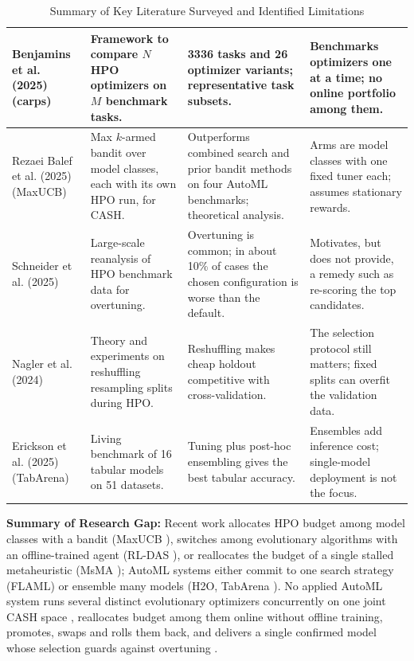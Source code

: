 \documentclass[11pt, a4paper]{article}
\begin{document}
\begin{table}[H]
\begin{tabular}{|p{3.2cm}|p{4.2cm}|p{4.0cm}|p{3.8cm}|}
        \hline
        Benjamins et al. (2025) \cite{benjamins2025carps} (carps) & Framework to compare $N$ HPO optimizers on $M$ benchmark tasks. & 3336 tasks and 26 optimizer variants; representative task subsets. & Benchmarks optimizers one at a time; no online portfolio among them. \\
        \hline
        Rezaei Balef et al. (2025) \cite{balef2025cash} (MaxUCB) & Max $k$-armed bandit over model classes, each with its own HPO run, for CASH. & Outperforms combined search and prior bandit methods on four AutoML benchmarks; theoretical analysis. & Arms are model classes with one fixed tuner each; assumes stationary rewards. \\
        \hline
        Schneider et al. (2025) \cite{schneider2025overtuning} & Large-scale reanalysis of HPO benchmark data for overtuning. & Overtuning is common; in about 10\% of cases the chosen configuration is worse than the default. & Motivates, but does not provide, a remedy such as re-scoring the top candidates. \\
        \hline
        Nagler et al. (2024) \cite{nagler2024reshuffling} & Theory and experiments on reshuffling resampling splits during HPO. & Reshuffling makes cheap holdout competitive with cross-validation. & The selection protocol still matters; fixed splits can overfit the validation data. \\
        \hline
        Erickson et al. (2025) \cite{erickson2025tabarena} (TabArena) & Living benchmark of 16 tabular models on 51 datasets. & Tuning plus post-hoc ensembling gives the best tabular accuracy. & Ensembles add inference cost; single-model deployment is not the focus. \\
        \hline
    \end{tabular}
    \caption{Summary of Key Literature Surveyed and Identified Limitations}
\end{table}

\noindent
\textbf{Summary of Research Gap:} Recent work allocates HPO budget among model classes with a bandit (MaxUCB \cite{balef2025cash}), switches among evolutionary algorithms with an offline-trained agent (RL-DAS \cite{guo2024deep}), or reallocates the budget of a single stalled metaheuristic (MsMA \cite{crepinsek2025overcoming}); AutoML systems either commit to one search strategy (FLAML) or ensemble many models (H2O, TabArena \cite{erickson2025tabarena}). No applied AutoML system runs several distinct evolutionary optimizers concurrently on one joint CASH space \cite{thornton2013autoweka}, reallocates budget among them online without offline training, promotes, swaps and rolls them back, and delivers a single confirmed model whose selection guards against overtuning \cite{schneider2025overtuning, nagler2024reshuffling}.
\end{document}
